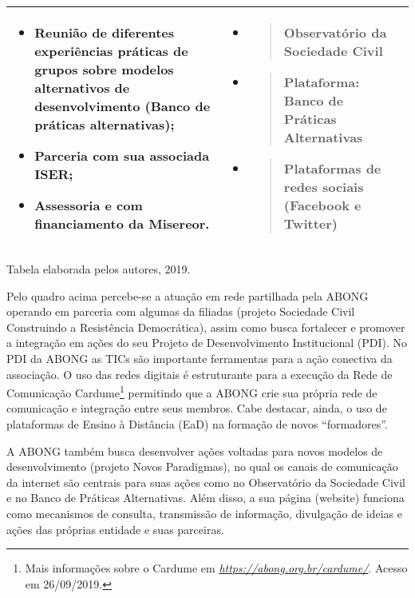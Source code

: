 \begin{longtable}[]{@{}lll@{}}
\begin{minipage}[t]{0.32\columnwidth}
\begin{itemize}
\item
  Reunião de diferentes experiências práticas de grupos sobre modelos
  alternativos de desenvolvimento (Banco de práticas alternativas);
\item
  Parceria com sua associada ISER;
\item
  Assessoria e com financiamento da Misereor.
\end{itemize}\strut
\end{minipage} & \begin{minipage}[t]{0.32\columnwidth}\raggedright\strut
\begin{itemize}
\item
  \begin{quote}
  Observatório da Sociedade Civil
  \end{quote}
\item
  \begin{quote}
  Plataforma: Banco de Práticas Alternativas
  \end{quote}
\item
  \begin{quote}
  Plataformas de redes sociais (Facebook e Twitter)
  \end{quote}
\end{itemize}\strut
\end{minipage}\tabularnewline
\bottomrule
\end{longtable}

Tabela elaborada pelos autores, 2019.

Pelo quadro acima percebe-se a atuação em rede partilhada pela ABONG
operando em parceria com algumas da filiadas (projeto Sociedade Civil
Construindo a Resistência Democrática), assim como busca fortalecer e
promover a integração em ações do seu Projeto de Desenvolvimento
Institucional (PDI). No PDI da ABONG as TICs são importante ferramentas
para a ação conectiva da associação. O uso das redes digitais é
estruturante para a execução da Rede de Comunicação Cardume\footnote{Mais
  informações sobre o Cardume em
  \href{https://abong.org.br/cardume/}{\emph{https://abong.org.br/cardume/}}.
  Acesso em 26/09/2019.} permitindo que a ABONG crie sua própria rede de
comunicação e integração entre seus membros. Cabe destacar, ainda, o uso
de plataformas de Ensino à Distância (EaD) na formação de novos
``formadores''.

A ABONG também busca desenvolver ações voltadas para novos modelos de
desenvolvimento (projeto Novos Paradigmas), no qual os canais de
comunicação da internet são centrais para suas ações como no
Observatório da Sociedade Civil e no Banco de Práticas Alternativas.
Além disso, a sua página (website) funciona como mecanismos de consulta,
transmissão de informação, divulgação de ideias e ações das próprias
entidade e suas parceiras.

